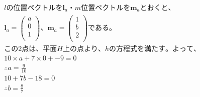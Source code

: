 \documentclass[dvipdfmx,uplatex]{jsarticle}
\begin{document}
  \begin{equation}
    \begin{aligned}
        &lの位置ベクトルを\bm{l}_{a}・m位置ベクトルを\bm{m}_{a}とおくと、\nonumber\\
        &\bm{l}_{a} = \begin{pmatrix} a\\ 0\\ 1\\ \end{pmatrix}、\bm{m}_{a} = \begin{pmatrix} 1\\ b\\ 2\\ \end{pmatrix}である。\nonumber\\
        &この2点は、平面H上の点より、hの方程式を満たす。よって、\nonumber\\
        &10 \times a + 7 \times 0 + -9 = 0 \nonumber\\
        &\therefore a=\frac{9}{10}\nonumber\\
        &10 + 7b -18 = 0\nonumber\\
        &\therefore b=\frac{8}{7}\nonumber\\
    \end{aligned}
  \end{equation}
\end{document}
